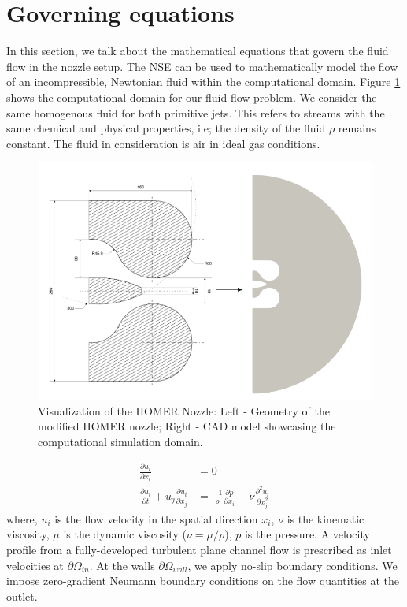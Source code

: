 \section{Governing equations} \label{goveq}
In this section, we talk about the mathematical equations that govern the fluid flow in the nozzle setup. The \gls{NSE} can be used to mathematically model the flow of an incompressible, Newtonian fluid within the computational domain. Figure \ref{fig:Domain} shows the computational domain for our fluid flow problem. We consider the same homogenous fluid for both primitive jets. This refers to streams with the same chemical and physical properties, i.e; the density of the fluid $\rho$ remains constant. The fluid in consideration is air in ideal gas conditions. 
\begin{figure}[ht]
  \centering
  \includegraphics[width=12cm]{images/Theory-CFD/Flow Domain.png}
  \caption{Visualization of the HOMER Nozzle: Left - Geometry of the modified HOMER nozzle; Right - CAD model showcasing the computational simulation domain.}
  \label{fig:Domain}
\end{figure}
\begin{equation}
  \begin{aligned}
  \frac{\partial u_i}{\partial x_i}&=0\\
  \frac{\partial u_i}{\partial t}+u_j \frac{\partial u_i}{\partial x_j}&=\frac{-1}{\rho} \frac{\partial p}{\partial x_i}+\nu \frac{\partial^2 u_i}{\partial x_j^2}
  \end{aligned}
  \end{equation}
where, $u_i$ is the flow velocity in the spatial direction $x_i$, $\nu$ is the kinematic viscosity, $\mu$ is the dynamic viscosity ($\nu = \mu / \rho$), $p$ is the pressure. A velocity profile from a fully-developed turbulent plane channel flow is prescribed as inlet velocities at $\partial{\Omega_{in}}$. At the walls $\partial{\Omega_{wall}}$, we apply no-slip boundary conditions. We impose zero-gradient Neumann boundary conditions on the flow quantities at the outlet.\\
